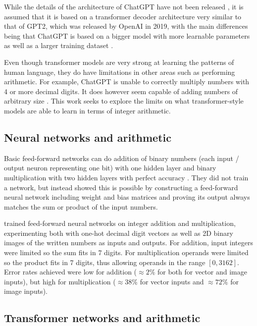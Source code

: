 While the details of the architecture of ChatGPT have not been released \cite{openai_chatgpt_2022} \cite{openai2023gpt4}, it is assumed that it is based on a transformer decoder architecture very similar to that of GPT2, which was released by OpenAI in 2019, with the main differences being that ChatGPT is based on a bigger model with more learnable parameters as well as a larger training dataset \cite{OpenGenus2023GPTComparison}.

Even though transformer models are very strong at learning the patterns of human language, they do have limitations in other areas such as performing arithmetic.
For example, ChatGPT is unable to correctly multiply numbers with 4 or more decimal digits. It does however seem capable of adding numbers of arbitrary size \cite{openai2023gpt4} .  This work seeks to explore the limits on what transformer-style models are able to learn in terms of integer arithmetic.

\subsection{Neural networks and arithmetic}

 Basic feed-forward networks can do addition of binary numbers (each input / output neuron representing one bit) with one hidden layer and binary multiplication with two hidden layers with perfect accuracy \cite{solving}. They did not train a network, but instead showed this is possible by constructing a feed-forward neural network including weight and bias matrices and proving its output always matches the sum or product of the input numbers.

\cite{visual} trained feed-forward neural networks on integer addition and multiplication, experimenting both with one-hot decimal digit vectors as well as 2D binary images of the written numbers as inputs and outputs. For addition, input integers were limited so the sum fits in 7 digits. For multiplication operands were limited so the product fits in 7 digits, thus allowing operands in the range $[0, 3162]$. Error rates achieved were low for addition ($\approx 2\%$ for both for vector and image inputs), but high for multiplication ($\approx 38\%$ for vector inputs and $\approx 72\%$ for image inputs).

\subsection{Transformer networks and arithmetic}

